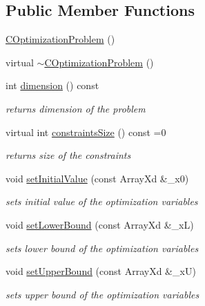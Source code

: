 \subsection*{Public Member Functions}
\begin{DoxyCompactItemize}
\item 
\hyperlink{class_go_s_u_m_1_1_c_optimization_problem_a9253623c4e54a8992b03544e04e510f2}{C\-Optimization\-Problem} ()
\item 
virtual \hyperlink{class_go_s_u_m_1_1_c_optimization_problem_ac26d3476f21b583715c72300bfae126c}{$\sim$\-C\-Optimization\-Problem} ()
\item 
int \hyperlink{class_go_s_u_m_1_1_c_optimization_problem_a6b7bb382260fdf1d843cf0c1bd0bdf59}{dimension} () const 
\begin{DoxyCompactList}\small\item\em returns dimension of the problem \end{DoxyCompactList}\item 
virtual int \hyperlink{class_go_s_u_m_1_1_c_optimization_problem_a524b91b7b3547159d89bdcb0ee25d4f6}{constraints\-Size} () const =0
\begin{DoxyCompactList}\small\item\em returns size of the constraints \end{DoxyCompactList}\item 
void \hyperlink{class_go_s_u_m_1_1_c_optimization_problem_a9f3a8248d141f5aad30e13f891010732}{set\-Initial\-Value} (const Array\-Xd \&\-\_\-x0)
\begin{DoxyCompactList}\small\item\em sets initial value of the optimization variables \end{DoxyCompactList}\item 
void \hyperlink{class_go_s_u_m_1_1_c_optimization_problem_a419774f00769540baee09838ae29e997}{set\-Lower\-Bound} (const Array\-Xd \&\-\_\-x\-L)
\begin{DoxyCompactList}\small\item\em sets lower bound of the optimization variables \end{DoxyCompactList}\item 
void \hyperlink{class_go_s_u_m_1_1_c_optimization_problem_a95ab54befe7a141f3e4fb152ab2c3316}{set\-Upper\-Bound} (const Array\-Xd \&\-\_\-x\-U)
\begin{DoxyCompactList}\small\item\em sets upper bound of the optimization variables \end{DoxyCompactList}\item 

\end{DoxyCompactItemize}
